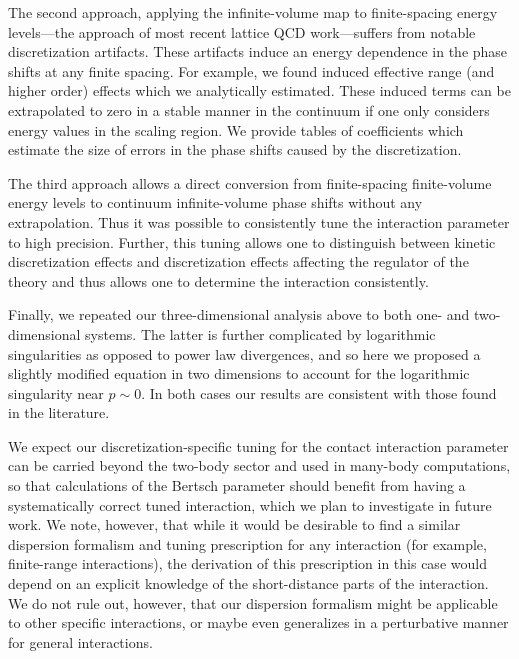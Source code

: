 The second approach, applying the infinite-volume map to finite-spacing energy levels---the approach of most recent lattice QCD work---suffers from notable discretization artifacts.
These artifacts induce an energy dependence in the phase shifts at any finite spacing.
For example, we found induced effective range (and higher order) effects which we analytically estimated.
These induced terms can be extrapolated to zero in a stable manner in the continuum if one only considers energy values in the scaling region.
We provide tables of coefficients which estimate the size of errors in the phase shifts caused by the discretization.

The third approach allows a direct conversion from finite-spacing finite-volume energy levels to continuum infinite-volume phase shifts without any extrapolation.
Thus it was possible to consistently tune the interaction parameter to high precision.
Further, this tuning allows one to distinguish between kinetic discretization effects and discretization effects affecting the regulator of the theory and thus allows one to determine the interaction consistently.

Finally, we repeated our three-dimensional analysis above to both one- and two-dimensional systems.
The latter is further complicated by logarithmic singularities as opposed to power law divergences, and so here we proposed a slightly modified \Luscher equation in two dimensions to account for the logarithmic singularity near $p\sim 0$.
In both cases our results are consistent with those found in the literature.

We expect our discretization-specific tuning for the contact interaction parameter can be carried beyond the two-body sector and used in many-body computations, so that calculations of the Bertsch parameter should benefit from having a systematically correct tuned interaction, which we plan to investigate in future work.
We note, however, that while it would be desirable to find a similar dispersion formalism and tuning prescription for any interaction (for example, finite-range interactions), the derivation of this prescription in this case would depend on an explicit knowledge of the short-distance parts of the interaction.
We do not rule out, however, that our dispersion formalism might be applicable to other specific interactions, or maybe even generalizes in a perturbative manner for general interactions.  %

